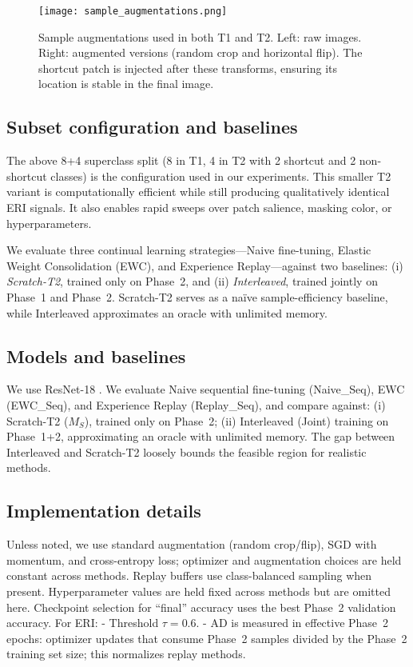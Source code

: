\documentclass[conference]{IEEEtran}
\begin{document}
\begin{figure}[htbp]
 \centering
 \texttt{[image: sample\_augmentations.png]}
 \caption{Sample augmentations used in both T1 and T2. Left: raw images. Right: augmented versions (random crop and horizontal flip). The shortcut patch is injected after these transforms, ensuring its location is stable in the final image.}
 \label{fig:augs}
\end{figure}

\subsection{Subset configuration and baselines}
The above 8+4 superclass split (8 in T1, 4 in T2 with 2 shortcut and 2 non-shortcut classes) is the configuration used in our experiments. This smaller T2 variant is computationally efficient while still producing qualitatively identical ERI signals. It also enables rapid sweeps over patch salience, masking color, or hyperparameters. 

We evaluate three continual learning strategies—Naive fine-tuning, Elastic Weight Consolidation (EWC), and Experience Replay—against two baselines: (i) \emph{Scratch-T2}, trained only on Phase~2, and (ii) \emph{Interleaved}, trained jointly on Phase~1 and Phase~2. Scratch-T2 serves as a naïve sample-efficiency baseline, while Interleaved approximates an oracle with unlimited memory.

\subsection{Models and baselines}
We use ResNet-18 \cite{DBLP:journals/corr/HeZRS15}. We evaluate Naive sequential fine-tuning (Naive\_Seq), EWC \cite{doi:10.1073/pnas.1611835114} (EWC\_Seq), and Experience Replay (Replay\_Seq), and compare against:
(i) Scratch-T2 (\(M_S\)), trained only on Phase~2;
(ii) Interleaved (Joint) training on Phase~1+2, approximating an oracle with unlimited memory. The gap between Interleaved and Scratch-T2 loosely bounds the feasible region for realistic methods.

\subsection{Implementation details}
Unless noted, we use standard augmentation (random crop/flip), SGD with momentum, and cross-entropy loss; optimizer and augmentation choices are held constant across methods. Replay buffers use class-balanced sampling when present. Hyperparameter values are held fixed across methods but are omitted here. Checkpoint selection for ``final'' accuracy uses the best Phase~2 validation accuracy. For ERI:
- Threshold \(\tau = 0.6\).
- AD is measured in effective Phase~2 epochs: optimizer updates that consume Phase~2 samples divided by the Phase~2 training set size; this normalizes replay methods.
\end{document}
